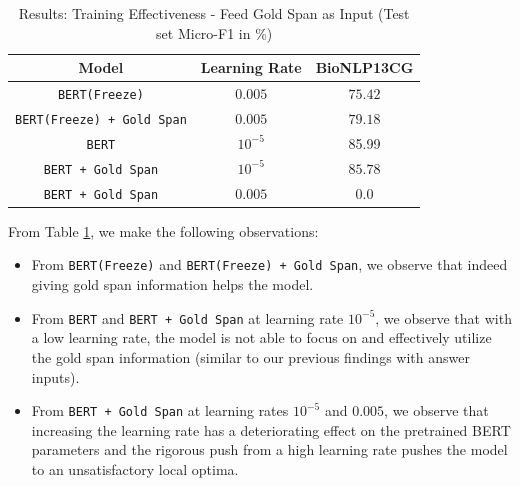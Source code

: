 \begin{table}[h!]
\centering
\begin{tabular}{|c|c|c|}\hline
	\textbf{Model} & \textbf{Learning Rate} & \textbf{BioNLP13CG}\\\hline
	\texttt{BERT(Freeze)} & $0.005$ & $75.42$\\\hline
	\texttt{BERT(Freeze) + Gold Span} & $0.005$ & $79.18$\\\hline
	\texttt{BERT} & $10^{-5}$ & 85.99\\\hline
	\texttt{BERT + Gold Span} & $10^{-5}$ & $85.78$\\\hline
	\texttt{BERT + Gold Span} & $0.005$ & $0.0$\\\hline
	\end{tabular}
    \caption{Results: Training Effectiveness - Feed Gold Span as Input (Test set Micro-F1 in \%)}
    \label{tab:res_training_span_input}
\end{table}

From Table \ref{tab:res_training_span_input}, we make the following observations:

\begin{itemize}
    \item From \texttt{BERT(Freeze)} and \texttt{BERT(Freeze) + Gold Span}, we observe that indeed giving gold span information helps the model.
    
    
    \item From \texttt{BERT} and \texttt{BERT + Gold Span} at learning rate $10^{-5}$, we observe that with a low learning rate, the model is not able to focus on and effectively utilize the gold span information (similar to our previous findings with answer inputs).
    
    \item From \texttt{BERT + Gold Span} at learning rates $10^{-5}$ and $0.005$, we observe that increasing the learning rate has a deteriorating effect on the pretrained BERT parameters and the rigorous push from a high learning rate pushes the model to an unsatisfactory local optima.
\end{itemize}


